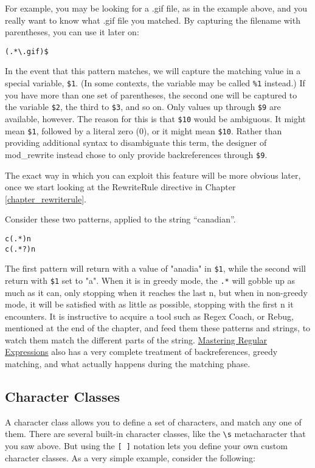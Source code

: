 For example, you may be looking for a .gif file, as in the example above, and you really 
want to know what .gif file you matched. By capturing the filename with parentheses, you can 
use it later on:

\verb=(.*\.gif)$=

In the event that this pattern matches, we will capture the matching value in a special 
variable, \verb=$1=. (In some contexts, the variable may be called \verb=%1= instead.) If you have more 
than one set of parentheses, the second one will be captured to the variable \verb=$2=, the third to \verb=$3=, 
and so on. Only values up through \verb=$9= are available, however.  The reason for this is that \verb=$10= 
would be ambiguous. It might mean \verb=$1=, followed by a literal zero (0), or it might mean \verb=$10=.  
Rather than providing additional syntax to disambiguate this term, the designer of 
mod\_rewrite instead chose to only provide backreferences through \verb=$9=.

The exact way in which you can exploit this feature will be more obvious later, once we 
start looking at the RewriteRule directive in Chapter \ref{chapter_rewriterule}.

Consider these two patterns, applied to the string ``canadian''.

\begin{verbatim}
c(.*)n
c(.*?)n
\end{verbatim}

The first pattern will return with a value of "anadia" in \verb=$1=, while the second will return 
with \verb=$1= set to "a". When it is in greedy mode, the \verb=.*= will gobble up as much as it can, only 
stopping when it reaches the last n, but when in non-greedy mode, it will be satisfied with as 
little as possible, stopping with the first n it encounters.
It is instructive to acquire a tool such as Regex Coach, or Rebug, mentioned at the end of 
the chapter, and feed them these patterns and strings, to watch them match the different parts 
of the string. \underline{Mastering Regular Expressions} also has a very complete treatment of 
backreferences, greedy matching, and what actually happens during the matching phase.

\subsection{Character Classes}
\index{[ ]}

A character class allows you to define a set of characters, and match any one of them. There 
are several built-in character classes, like the \verb=\s= metacharacter that you saw above. 
But using the \verb=[ ]= notation lets you define your own
custom character classes. As a very simple example, consider the following:

